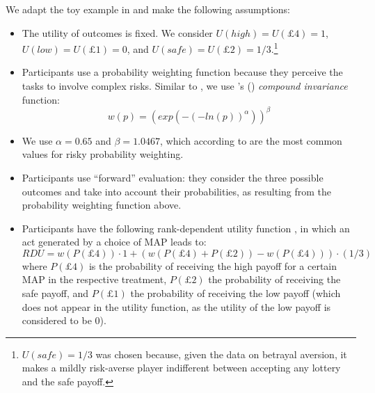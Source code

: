 We adapt the toy example in \cite{Li2020a} and make the following assumptions:
\begin{itemize}
\item The utility of outcomes is fixed. We consider $U(high) = U(\pounds4) = 1$, $U(low) = U(\pounds1) = 0$, and $U(safe) = U(\pounds2) = 1/3$.\footnote{
%
$U(safe)=1/3$ was chosen because, given the data on betrayal aversion, it makes a mildly risk-averse player indifferent between accepting any lottery and the safe payoff.
}
\item Participants use a probability weighting function because they perceive the tasks to involve complex risks. Similar to \cite{Li2020a}, we use \citeauthor{Prelec1998}'s (\citeyear{Prelec1998}) \textit{compound invariance} function:
$$w(p) = (exp(-(-ln(p))^\alpha))^\beta$$ 
\item We use $\alpha = 0.65$ and $\beta = 1.0467$, which according to \cite{Li2020a} are the most common values for risky probability weighting.
\item Participants use ``forward'' evaluation: they consider the three possible outcomes and take into account their probabilities, as resulting from the probability weighting function above.
\item Participants have the following rank-dependent utility function \citep{Schmeidler1989}, in which an act generated by a choice of MAP leads to:
$$RDU = w(P(\pounds4)) \cdot 1 + (w(P(\pounds4) + P(\pounds2)) - w(P(\pounds4))) \cdot (1/3)$$
where $P(\pounds4)$ is the probability of receiving the high payoff for a certain MAP in the respective treatment, $P(\pounds2)$ the probability of receiving the safe payoff, and $P(\pounds1)$ the probability of receiving the low payoff (which does not appear in the utility function, as the utility of the low payoff is considered to be 0).
\end{itemize}

